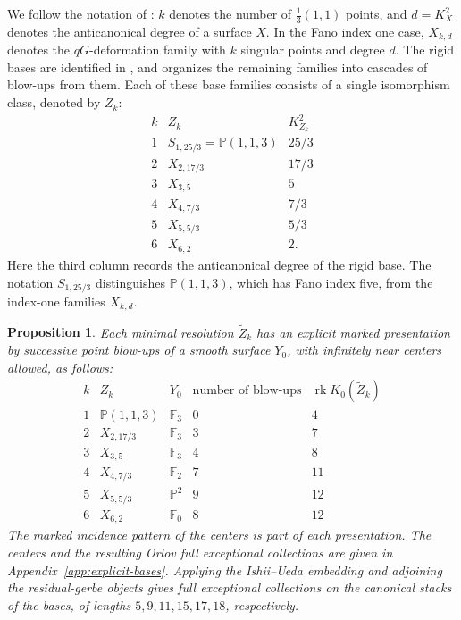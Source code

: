 \documentclass[11pt]{article}
\theoremstyle{plain}
\newtheorem{proposition}[proposition]{Proposition}
\theoremstyle{definition}
\theoremstyle{remark}
\newcommand{\Pp}{\mathbb P}
\newcommand{\F}{\mathbb F}
\newcommand{\rk}{\operatorname{rk}}
\begin{document}
We follow the notation of \cite[Theorem~4]{Corti2016}: \(k\) denotes the number of \(\frac13(1,1)\) points, and \(d=K_X^2\) denotes the anticanonical degree of a surface \(X\). In the Fano index one case, \(X_{k,d}\) denotes the \(qG\)-deformation family with \(k\) singular points and degree \(d\). The rigid bases are identified in \cite[Theorem~6 and Remark~7]{Corti2016}, and \cite[Corollary~8]{Corti2016} organizes the remaining families into cascades of blow-ups from them. Each of these base families consists of a single isomorphism class, denoted by \(Z_k\):
\[
\begin{array}{c|c|c}
k & Z_k & K_{Z_k}^2 \\ \hline
1 & S_{1,25/3}=\Pp(1,1,3) & 25/3 \\
2 & X_{2,17/3} & 17/3 \\
3 & X_{3,5} & 5 \\
4 & X_{4,7/3} & 7/3 \\
5 & X_{5,5/3} & 5/3 \\
6 & X_{6,2} & 2 .
\end{array}
\]
Here the third column records the anticanonical degree of the rigid base.
The notation \(S_{1,25/3}\) distinguishes \(\Pp(1,1,3)\), which has Fano
index five, from the index-one families \(X_{k,d}\).

\begin{proposition}\label{prop:explicit-rigid-bases}
Each minimal resolution \(\widetilde Z_k\) has an explicit marked
presentation by successive point blow-ups of a smooth surface \(Y_0\),
with infinitely near centers allowed, as follows:
\[
\begin{array}{c|c|c|c|c}
k&Z_k&Y_0&\text{number of blow-ups}&\rk K_0(\widetilde Z_k)\\ \hline
1&\Pp(1,1,3)&\F_3&0&4\\
2&X_{2,17/3}&\F_3&3&7\\
3&X_{3,5}&\F_3&4&8\\
4&X_{4,7/3}&\F_2&7&11\\
5&X_{5,5/3}&\Pp^2&9&12\\
6&X_{6,2}&\F_0&8&12
\end{array}
\]
The marked incidence pattern of the centers is part of each presentation.
The centers and the resulting Orlov full exceptional collections
are given in Appendix~\ref{app:explicit-bases}. Applying the Ishii--Ueda
embedding and adjoining the residual-gerbe objects gives full exceptional
collections on the canonical stacks of the bases, of lengths
\(5,9,11,15,17,18\), respectively.
\end{proposition}
\end{document}
